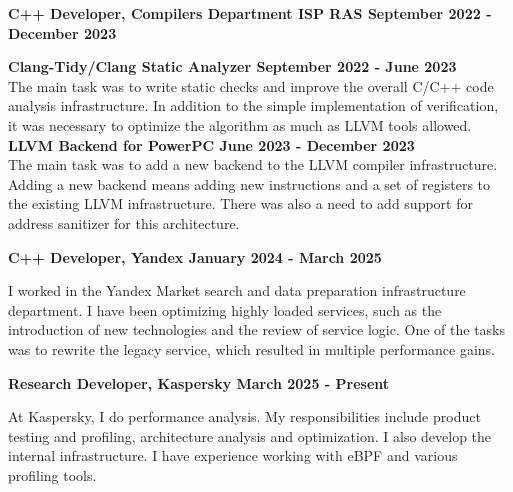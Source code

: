 \textbf{{C++ Developer, Compilers Department ISP RAS} \hfill September 2022 - December 2023}\par

\begin{itemize}
    \textbf{{Clang-Tidy/Clang Static Analyzer} \hfill September 2022 - June 2023} \\
  The main task was to write static checks and improve the overall C/C++ code analysis infrastructure. In addition to the simple implementation of verification, it was necessary to optimize the algorithm as much as LLVM tools allowed. \\

    \textbf{{LLVM Backend for PowerPC} \hfill June 2023 - December 2023}\\
    The main task was to add a new backend to the LLVM compiler infrastructure. Adding a new backend means adding new instructions and a set of registers to the existing LLVM infrastructure. There was also a need to add support for address sanitizer for this architecture.
\end{itemize} \par

\textbf{{C++ Developer, Yandex} \hfill January 2024 - March 2025} \par
\begin{itemize}
I worked in the Yandex Market search and data preparation infrastructure department. I have been optimizing highly loaded services, such as the introduction of new technologies and the review of service logic.
One of the tasks was to rewrite the legacy service, which resulted in multiple performance gains.
\end{itemize}

\textbf{{Research Developer, Kaspersky} \hfill March 2025 - Present}
\begin{itemize}
    At Kaspersky, I do performance analysis. My responsibilities include product testing and profiling, architecture analysis and optimization. I also develop the internal infrastructure. I have experience working with eBPF and various profiling tools.   
\end{itemize}